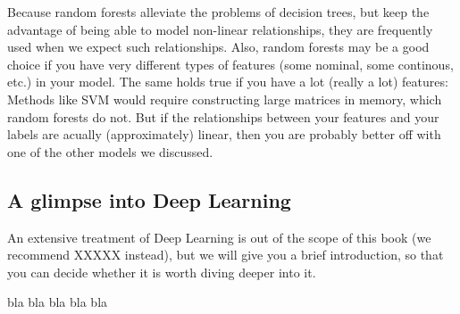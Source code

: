 Because random forests alleviate the problems of decision trees, but keep the advantage of being able to model non-linear relationships, they are frequently used when we expect such relationships.
Also, random forests may be a good choice if you have very different types of features (some nominal, some continous, etc.) in your model. The same holds true if you have a lot (really a lot) features: Methods like SVM would require constructing large matrices in memory, which random forests do not.
But if the relationships between your features and your labels are acually (approximately) linear, then you are probably better off with one of the other models we discussed.


\subsection{A glimpse into Deep Learning} 

An extensive treatment of Deep Learning is out of the scope of this book (we recommend XXXXX instead), but we will give you a brief introduction, so that you can decide whether it is worth diving deeper into it.

bla
bla
bla
bla
bla
